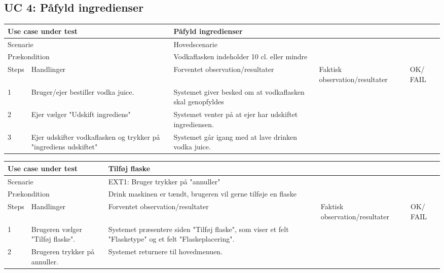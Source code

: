 \subsection{UC 4: Påfyld ingredienser}

\begin{table}[H]
\begin{tabular}{|p{1cm}|p{4cm}|p{4cm}|p{4cm}|p{1cm}|}
\hline
\multicolumn{2}{|p{5cm}|}{Use case under test} & \multicolumn{3}{p{9cm}|}{Påfyld ingredienser}                                       \\ \hline
\multicolumn{2}{|p{5cm}|}{Scenarie}            & \multicolumn{3}{p{9cm}|}{Hovedscenarie}                                          \\ \hline
\multicolumn{2}{|p{5cm}|}{Prækondition}        & \multicolumn{3}{p{9cm}|}{Vodkaflasken indeholder 10 cl. eller mindre}                                 \\ \hline
Steps               & Handlinger          & Forventet observation/resultater & Faktisk observation/resultater & OK/ FAIL \\ \hline
1    & Bruger/ejer bestiller vodka juice.  & Systemet giver besked om at vodkaflasken skal genopfyldes&   &         \\ \hline
2    & Ejer vælger "Udskift ingrediens"  & Systemet venter på at ejer har udskiftet ingrediensen.  &   &         \\ \hline
3    & Ejer udskifter vodkaflasken og trykker på "ingrediens udskiftet" &  Systemet går igang med at lave drinken vodka juice.   &   & \\ \hline

\end{tabular}
\end{table}


\begin{table}[H]
\begin{tabular}{|p{1cm}|p{4cm}|p{4cm}|p{4cm}|p{1cm}|}
\hline
\multicolumn{2}{|p{5cm}|}{Use case under test} & \multicolumn{3}{p{9cm}|}{Tilføj flaske}                                       \\ \hline
\multicolumn{2}{|p{5cm}|}{Scenarie}            & \multicolumn{3}{p{9cm}|}{EXT1: Bruger trykker på "annuller"}                                          \\ \hline
\multicolumn{2}{|p{5cm}|}{Prækondition}        & \multicolumn{3}{p{9cm}|}{Drink maskinen er tændt, brugeren vil gerne tilføje en flaske}                                 \\ \hline
Steps               & Handlinger          & Forventet observation/resultater & Faktisk observation/resultater & OK/ FAIL \\ \hline
1    & Brugeren vælger "Tilføj flaske".  & Systemet præsentere siden "Tilføj flaske", som viser et felt "Flasketype" og et felt "Flaskeplacering".&   &         \\ \hline
2    & Brugeren trykker på annuller.  & Systemet returnere til hovedmenuen.  &   &         \\ \hline
\end{tabular}
\end{table}



